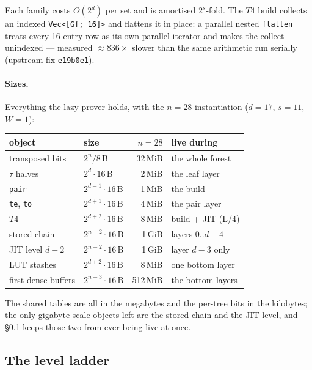 \documentclass[11pt]{article}
\newcommand{\code}[1]{{\def\_{\textunderscore\allowbreak}\texttt{#1}}}
\theoremstyle{definition}
\begin{document}
Each family costs $O(2^d)$ per set and is amortised $2^s$-fold.  The
$T4$ build collects an indexed \code{Vec<[Gf; 16]>} and flattens it in
place: a parallel nested \code{flatten} treats every 16-entry row as its
own parallel iterator and makes the collect unindexed --- measured
${\approx}836\times$ slower than the same arithmetic run serially
(upstream fix \code{e19b0e1}).

\paragraph{Sizes.}
Everything the lazy prover holds, with the $n = 28$ instantiation
($d = 17$, $s = 11$, $W = 1$):
\begin{center}
\small
\begin{tabular}{llrl}
\toprule
object & size & $n = 28$ & live during \\
\midrule
transposed bits          & $2^n/8$\,B          & 32\,MiB  & the whole forest \\
$\tau$ halves            & $2^d\!\cdot\!16$\,B & 2\,MiB   & the leaf layer \\
\code{pair}              & $2^{d-1}\!\cdot\!16$\,B & 1\,MiB & the build \\
\code{te}, \code{to}     & $2^{d+1}\!\cdot\!16$\,B & 4\,MiB & the pair layer \\
$T4$                     & $2^{d+2}\!\cdot\!16$\,B & 8\,MiB & build + JIT (L/4) \\
\midrule
stored chain             & $2^{n-2}\!\cdot\!16$\,B & 1\,GiB & layers $0..d{-}4$ \\
JIT level $d{-}2$        & $2^{n-2}\!\cdot\!16$\,B & 1\,GiB & layer $d{-}3$ only \\
LUT stashes              & $2^{d+2}\!\cdot\!16$\,B & 8\,MiB & one bottom layer \\
first dense buffers      & $2^{n-3}\!\cdot\!16$\,B & 512\,MiB & the bottom layers \\
\bottomrule
\end{tabular}
\end{center}
The shared tables are all in the megabytes and the per-tree bits in the
kilobytes; the only gigabyte-scale objects left are the stored chain and
the JIT level, and \S\ref{sec:ladder} keeps those two from ever being
live at once.

\subsection{The level ladder}
\label{sec:ladder}
\end{document}

